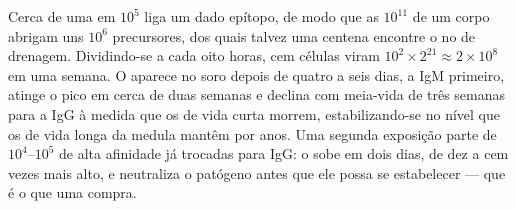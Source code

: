 \begin{example}\label{ex:b3:adaptive-immunity:kinetics}
Cerca de uma  em $10^{5}$ liga um dado epítopo, de modo que as
$10^{11}$  de um corpo abrigam uns $10^{6}$ precursores, dos
quais talvez uma centena encontre o  no  de drenagem.
Dividindo-se a cada oito horas, cem células viram $10^{2}\times 2^{21} \approx 2\times 10^{8}$ em uma semana. O  aparece no soro
depois de quatro a seis dias, a IgM primeiro, atinge o pico em cerca de
duas semanas e declina com meia-vida de três semanas para a IgG à
medida que os  de vida curta morrem, estabilizando-se no
nível que os  de vida longa da medula mantêm por anos. Uma
segunda exposição parte de $10^{4}$--$10^{5}$  de alta
afinidade já trocadas para IgG: o  sobe em dois dias, de dez a
cem vezes mais alto, e neutraliza o patógeno antes que ele possa se
estabelecer --- que é o que uma  compra.
\end{example}

